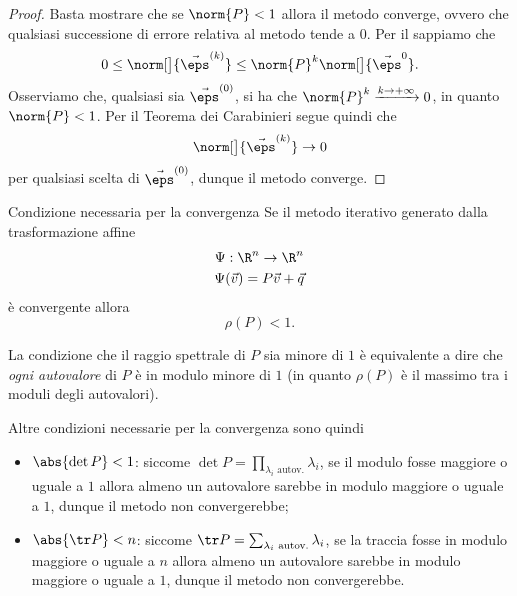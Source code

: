 \begin{proof}
    Basta mostrare che se $\norm{P} < 1$ allora il metodo converge, ovvero che qualsiasi successione di errore relativa al metodo tende a $0$. Per il  sappiamo che \[
        0 \leq \norm[\big]{\vec \eps^{(k)}} \leq \norm{P}^k \norm[\big]{\vec \eps^{0}}.
    \] Osserviamo che, qualsiasi sia $\vec \eps^{(0)}$, si ha che $\norm{P}^k \xrightarrow{k \to +\infty} 0$, in quanto $\norm{P} < 1$. Per il Teorema dei Carabinieri segue quindi che \[
        \norm[\big]{\vec \eps^{(k)}} \to 0
    \] per qualsiasi scelta di $\vec \eps^{(0)}$, dunque il metodo converge. 
\end{proof}

\begin{theorem}
    {Condizione necessaria per la convergenza}{}
    Se il metodo iterativo generato dalla trasformazione affine 
    \begin{gather*}
        \Psi : \R^n \to \R^n\\
        \Psi(\vec v) = P\vec v + \vec q
    \end{gather*} è convergente allora \[
        \rho(P) < 1.
    \]
\end{theorem}

La condizione che il raggio spettrale di $P$ sia minore di $1$ è equivalente a dire che \emph{ogni autovalore} di $P$ è in modulo minore di $1$ (in quanto $\rho(P)$ è il massimo tra i moduli degli autovalori).

Altre condizioni necessarie per la convergenza sono quindi \begin{itemize}
    \item $\abs{\det P} < 1$: siccome $\det P = \prod_{\lambda_i \text{ autov.}} \lambda_i$, se il modulo fosse maggiore o uguale a $1$ allora almeno un autovalore sarebbe in modulo maggiore o uguale a $1$, dunque il metodo non convergerebbe;
    \item $\abs{\tr P} < n$: siccome $\tr P = \sum_{\lambda_i \text{ autov.}} \lambda_i$, se la traccia fosse in modulo maggiore o uguale a $n$ allora almeno un autovalore sarebbe in modulo maggiore o uguale a $1$, dunque il metodo non convergerebbe.    
\end{itemize}

